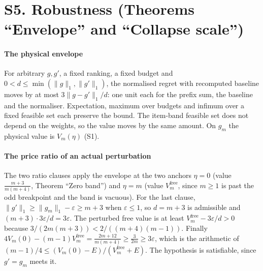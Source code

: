 
\section{S5. Robustness (Theorems ``Envelope'' and ``Collapse scale'')}

\paragraph{The physical envelope} For arbitrary $g,g'$, a fixed ranking, a fixed budget and
$0<d\le\min(\|g\|_{1},\|g'\|_{1})$, the normalised regret with recomputed baseline moves by
at most $3\|g-g'\|_{1}/d$: one unit each for the prefix sum, the baseline and the
normaliser. Expectation, maximum over budgets and infimum over a fixed feasible set each
preserve the bound. The item-band feasible set does not depend on the weights, so the value
moves by the same amount. On $g_{m}$ the physical value is $V_{m}(\eta)$ (S1).


\paragraph{The price ratio of an actual perturbation} The two ratio clauses apply the envelope
at the two anchors $\eta=0$ (value $\frac{m+3}{m(m+4)}$, Theorem ``Zero band'') and $\eta=m$ (value
$V^{\mathrm{free}}_{m}$, since $m\ge1$ is past the odd breakpoint and the band is vacuous).
For the last clause, $\|g'\|_{1}\ge\|g_{m}\|_{1}-\varepsilon\ge m+3$ when $\varepsilon\le1$, so $d=m+3$ is
admissible and $(m+3)\cdot3\varepsilon/d=3\varepsilon$. The perturbed free value is at least
$V^{\mathrm{free}}_{m}-3\varepsilon/d>0$ because
$3/(2m(m+3))<2/((m+4)(m-1))$. Finally
$4V_{m}(0)-(m-1)V^{\mathrm{free}}_{m}=\frac{2m+12}{m(m+4)}\ge\frac{3}{2m}\ge3\varepsilon$, which is the
arithmetic of $(m-1)/4\le(V_{m}(0)-E)/(V^{\mathrm{free}}_{m}+E)$. The hypothesis is
satisfiable, since $g'=g_{m}$ meets it.

